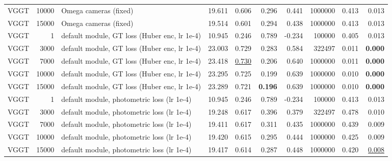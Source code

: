 \begin{table}[H]
\begin{tabular}{lrlrrrrrrr}
VGGT & 10000 & Omega cameras (fixed) & 19.611 & 0.606 & 0.296 & 0.441 & 1000000 & 0.413 & 0.013 \\
VGGT & 15000 & Omega cameras (fixed) & 19.514 & 0.601 & 0.294 & 0.438 & 1000000 & 0.413 & 0.013 \\
VGGT & 1 & default module, GT loss (Huber enc, lr 1e-4) & 10.945 & 0.246 & 0.789 & -0.234 & 100000 & 0.405 & 0.013 \\
VGGT & 3000 & default module, GT loss (Huber enc, lr 1e-4) & 23.003 & 0.729 & 0.283 & 0.584 & 322497 & 0.011 & \textbf{0.000} \\
VGGT & 7000 & default module, GT loss (Huber enc, lr 1e-4) & 23.418 & \underline{0.730} & 0.206 & 0.640 & 1000000 & 0.011 & \textbf{0.000} \\
VGGT & 10000 & default module, GT loss (Huber enc, lr 1e-4) & 23.295 & 0.725 & 0.199 & 0.639 & 1000000 & 0.010 & \textbf{0.000} \\
VGGT & 15000 & default module, GT loss (Huber enc, lr 1e-4) & 23.289 & 0.721 & \textbf{0.196} & 0.639 & 1000000 & 0.010 & \textbf{0.000} \\
VGGT & 1 & default module, photometric loss (lr 1e-4) & 10.945 & 0.246 & 0.789 & -0.234 & 100000 & 0.413 & 0.013 \\
VGGT & 3000 & default module, photometric loss (lr 1e-4) & 19.248 & 0.617 & 0.396 & 0.379 & 322497 & 0.478 & 0.010 \\
VGGT & 7000 & default module, photometric loss (lr 1e-4) & 19.411 & 0.617 & 0.311 & 0.435 & 1000000 & 0.439 & 0.009 \\
VGGT & 10000 & default module, photometric loss (lr 1e-4) & 19.420 & 0.615 & 0.295 & 0.444 & 1000000 & 0.425 & 0.009 \\
VGGT & 15000 & default module, photometric loss (lr 1e-4) & 19.417 & 0.614 & 0.287 & 0.448 & 1000000 & 0.420 & \underline{0.008} \\
\bottomrule
\end{tabular}
\end{table}